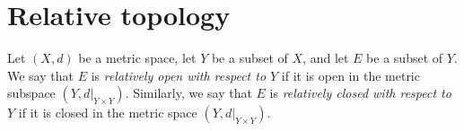 \section{Relative topology}\label{sec 1.3}

\setcounter{theorem}{2}
\begin{definition}\label{1.3.3}
    Let \((X, d)\) be a metric space, let \(Y\) be a subset of \(X\), and let \(E\) be a subset of \(Y\).
    We say that \(E\) is \emph{relatively open with respect to \(Y\)} if it is open in the metric subspace \((Y, d|_{Y \times Y})\).
    Similarly, we say that \(E\) is \emph{relatively closed with respect to \(Y\)} if it is closed in the metric space \((Y, d|_{Y \times Y})\).
\end{definition}